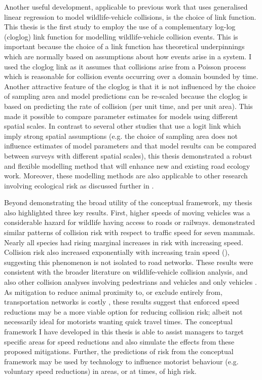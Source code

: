 Another useful development, applicable to previous work that uses generalised linear regression to model wildlife-vehicle collisions, is the choice of link function. This thesis is the first study to employ the use of a complementary log-log (cloglog) link function for modelling wildlife-vehicle collision events. This is important because the choice of a link function has theoretical underpinnings which are normally based on assumptions about how events arise in a system. I used the cloglog link as it assumes that collisions arise from a Poisson process which is reasonable for collision events occurring over a domain bounded by time. Another attractive feature of the cloglog is that it is not influenced by the choice of sampling area and model predictions can be re-scaled because the cloglog is based on predicting the rate of collision (per unit time, and per unit area). This made it possible to compare parameter estimates for models using different spatial scales. In contrast to several other studies that use a logit link \citep[i.e. logistic regression, see ][]{seo15,gund98} which imply strong spatial assumptions (e.g. the choice of sampling area does not influence estimates of model parameters and that model results can be compared between surveys with different spatial scales), this thesis demonstrated a robust and flexible modelling method that will enhance new and existing road ecology work. Moreover, these modelling methods are also applicable to other research involving ecological risk as discussed further in .

Beyond demonstrating the broad utility of the conceptual framework, my thesis also highlighted three key results. First, higher speeds of moving vehicles was a considerable hazard for wildlife having access to roads or railways.  demonstrated similar patterns of collision risk with respect to traffic speed for seven mammals. Nearly all species had rising marginal increases in risk with increasing speed. Collision risk also increased exponentially with increasing train speed (), suggesting this phenomenon is not isolated to road networks. These results were consistent with the broader literature on wildlife-vehicle collision analysis, and also other collision analyses involving pedestrians and vehicles \citep{rosen09} and only vehicles \citep{liu97}. As mitigation to reduce animal proximity to, or exclude entirely from, transportation networks is costly \citep{huij09}, these results suggest that enforced speed reductions may be a more viable option for reducing collision risk; albeit not necessarily ideal for motorists wanting quick travel times. The conceptual framework I have developed in this thesis is able to assist managers to target specific areas for speed reductions and also simulate the effects from these proposed mitigations. Further, the predictions of risk from the conceptual framework may be used by technology to influence motorist behaviour (e.g. voluntary speed reductions) in areas, or at times, of high risk.


